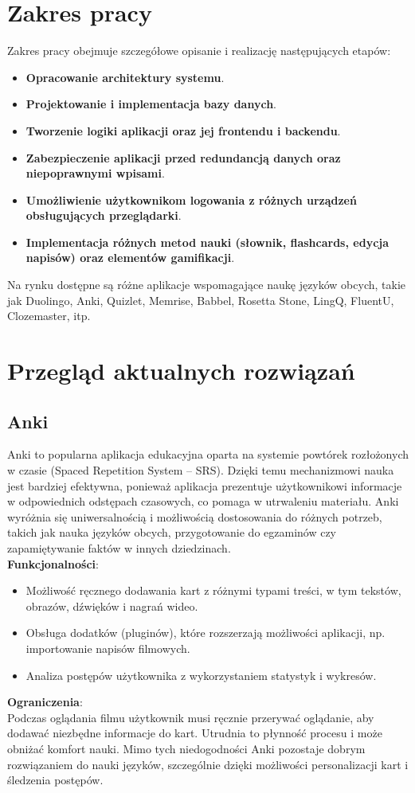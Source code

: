 \section{Zakres pracy}
Zakres pracy obejmuje szczegółowe opisanie i realizację następujących etapów:

\begin{itemize}
    \item \textbf{Opracowanie architektury systemu}.
    \item \textbf{Projektowanie i implementacja bazy danych}.
    \item \textbf{Tworzenie logiki aplikacji oraz jej frontendu i backendu}.
    \item \textbf{Zabezpieczenie aplikacji przed redundancją danych oraz niepoprawnymi wpisami}.
    \item \textbf{Umożliwienie użytkownikom logowania z różnych urządzeń obsługujących przeglądarki}.
    \item \textbf{Implementacja różnych metod nauki (słownik, flashcards, edycja napisów) oraz elementów gamifikacji}.
\end{itemize}
Na rynku dostępne są różne aplikacje wspomagające naukę języków obcych, takie jak Duolingo, Anki, Quizlet, Memrise, Babbel, Rosetta Stone, LingQ, FluentU, Clozemaster, itp.
\section{Przegląd aktualnych rozwiązań}

\subsection{Anki}
Anki to popularna aplikacja edukacyjna oparta na systemie powtórek rozłożonych w czasie (Spaced Repetition System – SRS). Dzięki temu mechanizmowi nauka jest bardziej efektywna, ponieważ aplikacja prezentuje użytkownikowi informacje w odpowiednich odstępach czasowych, co pomaga w utrwaleniu materiału. Anki wyróżnia się uniwersalnością i możliwością dostosowania do różnych potrzeb, takich jak nauka języków obcych, przygotowanie do egzaminów czy zapamiętywanie faktów w innych dziedzinach. \\
\textbf{Funkcjonalności}:
\begin{itemize}
    \item Możliwość ręcznego dodawania kart z różnymi typami treści, w tym tekstów, obrazów, dźwięków i nagrań wideo.
    \item Obsługa dodatków (pluginów), które rozszerzają możliwości aplikacji, np. importowanie napisów filmowych.
    \item Analiza postępów użytkownika z wykorzystaniem statystyk i wykresów.
\end{itemize}
\textbf{Ograniczenia}: \\
Podczas oglądania filmu użytkownik musi ręcznie przerywać oglądanie, aby dodawać niezbędne informacje do kart. Utrudnia to płynność procesu i może obniżać komfort nauki. Mimo tych niedogodności Anki pozostaje dobrym rozwiązaniem do nauki języków, szczególnie dzięki możliwości personalizacji kart i śledzenia postępów.

